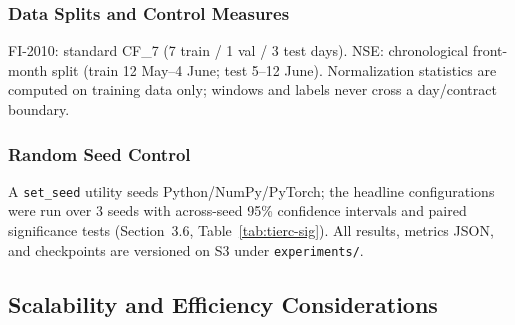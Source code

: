 \documentclass[11pt]{article}
\begin{document}
\subsubsection{Data Splits and Control Measures}
FI-2010: standard CF\_7 (7 train / 1 val / 3 test days). NSE: chronological front-month split (train
12 May--4 June; test 5--12 June). Normalization statistics are computed on training data only; windows and
labels never cross a day/contract boundary.
\subsubsection{Random Seed Control}
A \texttt{set\_seed} utility seeds Python/NumPy/PyTorch; the headline configurations were run over 3 seeds
with across-seed 95\% confidence intervals and paired significance tests (Section~3.6,
Table~\ref{tab:tierc-sig}). All results, metrics JSON, and checkpoints are versioned on S3 under
\texttt{experiments/}.

\subsection{Scalability and Efficiency Considerations}
\end{document}
